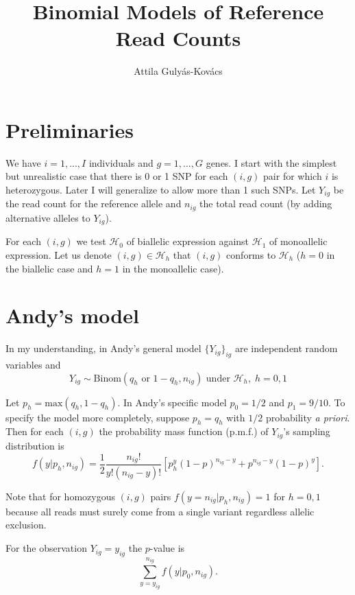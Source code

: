\documentclass[letterpaper]{article}
\title{Binomial Models of Reference Read Counts}
\author{Attila Gulyás-Kovács}
\begin{document}
\maketitle

\section{Preliminaries}

We have \(i=1,...,I\) individuals and \(g=1,...,G\) genes.  I start with the
simplest but unrealistic case that there is 0 or 1 SNP for each \((i,g)\) pair
for which \(i\) is heterozygous.  Later I will generalize to allow more than 1
such SNPs.  Let \(Y_{ig}\) be the read count for the reference allele and
\(n_{ig}\) the total read count (by adding alternative alleles to \(Y_{ig}\)).

For each \((i,g)\) we test \(\mathcal{H}_0\) of biallelic expression against
\(\mathcal{H}_1\) of monoallelic expression.  Let us denote
\((i,g)\in\mathcal{H}_h\) that \((i,g)\) conforms to \(\mathcal{H}_h\)
(\(h=0\) in the biallelic case and \(h=1\) in the monoallelic case).

\section{Andy's model}

In my understanding, in Andy's general model
\(\{Y_{ig}\}_{ig}\) are independent random variables and
\begin{equation}
Y_{ig} \sim \mathrm{Binom}(q_h \text{ or } 1 - q_h, n_{ig}) \text{ under }
\mathcal{H}_h, \; h=0,1
\end{equation}

Let \(p_h = \mathrm{max}(q_h, 1-q_h)\).  In Andy's specific model \(p_0 =
1/2\) and \(p_1=9/10\).  To specify the model more completely, suppose \(p_h =
q_h\) with \(1/2\) probability \emph{a priori}.  Then for each \((i,g)\) the
probability mass function (p.m.f.) of \(Y_{ig}\)'s sampling distribution is
\begin{equation}
f(y|p_h, n_{ig}) = \frac{1}{2} \frac{n_{ig}!}{y! (n_{ig}-y)!} \left[ p_h^{y}
(1-p)^{n_{ig}-y} + p^{n_{ig}-y} (1-p)^{y} \right].
\end{equation}

Note that for homozygous \((i,g)\) pairs \(f(y=n_{ig}|p_h,n_{ig})=1\) for \(h=0,1\)
because all reads must surely come from a single variant regardless allelic
exclusion.


For the observation \(Y_{ig}=y_{ig}\) the \(p\)-value is 
\begin{equation}
\sum_{y=y_{ig}}^{n_{ig}} f(y|p_0,n_{ig}).
\end{equation}
\end{document}
